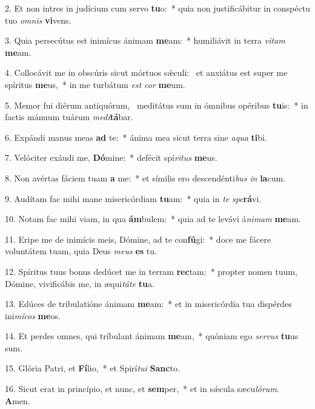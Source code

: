 2. Et non intres in judícium cum servo \textbf{tu}o:~*  quia non justificábitur in conspéctu tuo \textit{om}\textit{nis} \textbf{vi}vens.\

3. Quia persecútus est inimícus ánimam \textbf{me}am:~*  humiliávit in terra \textit{vi}\textit{tam} \textbf{me}am.\

4. Collocávit me in obscúris sicut mórtuos sǽculi: \dag\  et anxiátus est super me spíritus \textbf{me}us,~*  in me turbátum \textit{est} \textit{cor} \textbf{me}um.\

5. Memor fui diérum antiquórum, \dag\  meditátus sum in ómnibus opéribus \textbf{tu}is:~*  in factis mánuum tuárum \textit{me}\textit{di}\textbf{tá}bar.\

6. Expándi manus meas \textbf{ad} te:~*  ánima mea sicut terra sine \textit{a}\textit{qua} \textbf{ti}bi.\

7. Velóciter exáudi me, \textbf{Dó}mine:~*  defécit spí\textit{ri}\textit{tus} \textbf{me}us.\

8. Non avértas fáciem tuam \textbf{a} me:~*  et símilis ero descendénti\textit{bus} \textit{in} \textbf{la}cum.\

9. Audítam fac mihi mane misericórdiam \textbf{tu}am:~*  quia in \textit{te} \textit{spe}\textbf{rá}vi.\

10. Notam fac mihi viam, in qua \textbf{ám}bulem:~*  quia ad te levávi á\textit{ni}\textit{mam} \textbf{me}am.\

11. Eripe me de inimícis meis, Dómine, ad te con\textbf{fú}gi:~*  doce me fácere voluntátem tuam, quia Deus \textit{me}\textit{us} \textbf{es} tu.\

12. Spíritus tuus bonus dedúcet me in terram \textbf{rec}tam:~*  propter nomen tuum, Dómine, vivificábis me, in æqui\textit{tá}\textit{te} \textbf{tu}a.\

13. Edúces de tribulatióne ánimam \textbf{me}am:~*  et in misericórdia tua dispérdes ini\textit{mí}\textit{cos} \textbf{me}os.\

14. Et perdes omnes, qui tríbulant ánimam \textbf{me}am,~*  quóniam ego \textit{ser}\textit{vus} \textbf{tu}us sum.\

15. Glória Patri, et \textbf{Fí}lio,~*  et Spirí\textit{tu}\textit{i} \textbf{Sanc}to.\

16. Sicut erat in princípio, et nunc, et \textbf{sem}per,~*  et in sǽcula sæcu\textit{ló}\textit{rum}. \textbf{A}men.\

